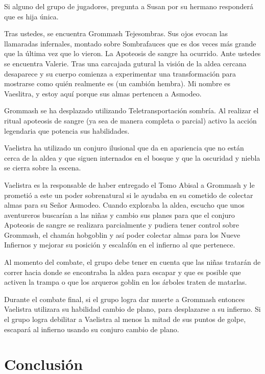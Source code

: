 \documentclass[10pt,twoside,twocolumn,openany]{dndbook}
\begin{document}
Si alguno del grupo de jugadores, pregunta a Susan por su hermano responderá que es hija única.

\begin{DndReadAloud}
  Tras ustedes, se encuentra Grommash Tejesombras. Sus ojos evocan las llamaradas infernales,
  montado sobre Sombrafauces que es dos veces más grande que la última vez que lo vieron.
  La Apoteosis de sangre ha ocurrido. Ante ustedes se encuentra Valerie. Tras una carcajada gutural
  la visión de la aldea cercana desaparece y su cuerpo comienza a experimentar una transformación
  para mostrarse como quién realmente es (un cambión hembra). Mi nombre es Vaeslitra, y estoy aquí 
  porque sus almas pertencen a Asmodeo.
\end{DndReadAloud}

Grommash se ha desplazado utilizando Teletransportación sombría. Al realizar el ritual apoteosis 
de sangre (ya sea de manera completa o parcial) activo la acción legendaria que potencia sus 
habilidades.

Vaelistra ha utilizado un conjuro ilusional que da en apariencia que no están cerca de la aldea y 
que siguen internados en el bosque y que la oscuridad y niebla se cierra sobre la escena. 

Vaelistra es la responsable de haber entregado el Tomo Abisal a Grommash y le prometió a este un 
poder sobrenatural si le ayudaba en su cometido de colectar almas para su Señor Asmodeo. Cuando 
exploraba la aldea, escucho que unos aventureros buscarían a las niñas y cambio sus planes para que 
el conjuro Apoteosis de sangre se realizara parcialmente y pudiera tener control sobre Grommash, 
el chamán hobgoblin y así poder colectar almas para los Nueve Infiernos y mejorar su posición y 
escalafón en el infierno al que pertenece.

Al momento del combate, el grupo debe tener en cuenta que las niñas tratarán de correr hacia 
donde se encontraba la aldea para escapar y que es posible que activen la trampa o que los 
arqueros goblin en los árboles traten de matarlas.

Durante el combate final, si el grupo logra dar muerte a Grommash entonces Vaelistra utilizara
su habilidad cambio de plano, para desplazarse a su infierno. Si el grupo logra debilitar a 
Vaelistra al menos la mitad de sus puntos de golpe, escapará al infierno usando su conjuro cambio 
de plano.


\section{Conclusión}
\end{document}
